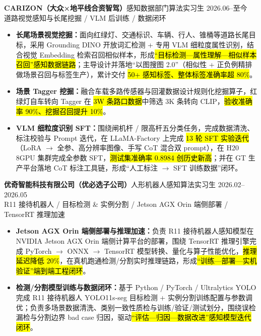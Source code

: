 \section[实习经历]{}
{\small\textbf{CARIZON（大众×地平线合资智驾）}}\quad 感知数据部门算法实习生 \hfill {2026.06--至今}\\
{\scriptsize\color{WHU_Blue} 道路视觉感知与长尾挖掘 / VLM 后训练 / 数据闭环}
\begin{itemize}
    \item \textbf{长尾场景视觉挖掘：}面向红绿灯、交通标识、车辆、行人、锥桶等道路长尾目标，采用 Grounding DINO 开放词汇检测 + 专用 VLM 细粒度属性识别，结合视觉 Embedding 检索召回相似样本，形成\hl{“目标检测—属性理解—相似样本召回”感知数据链路}；主导设计并落地“以图搜图 2.0”（相似性 + 正负例精排做场景召回与标签生产），累计交付 \hl{50+ 感知标签、整体标签准确率超 80\%}。
    \item \textbf{场景 Tagger 挖掘：}融合车载多路传感器与回灌数据设计规则化挖掘算子，红绿灯自车转向 Tagger 在 \hl{3W 条路口数据}中筛选 3K 条转向 CLIP，\hl{验收准确率 90\%、挖掘召回提升 10\%}。
    \item \textbf{VLM 细粒度识别 SFT：}围绕闸机杆 / 限高杆五分类任务，完成数据清洗、标注校验与 Prompt 迭代，在 LLaMA-Factory 上完成 \hl{13 轮 SFT 实验迭代}（LoRA $\rightarrow$ 全参、高分辨率图像、手写 CoT 混合双 prompt），在 H20 8GPU 集群完成全参数 SFT，\hl{测试集准确率 0.8984 创历史新高}；并在 GT 生产平台落地 CoT 标注工具链，形成“人工标注 $\rightarrow$ SFT 训练数据”闭环。
\end{itemize}

\vspace{0.30em}
{\small\textbf{优奇智能科技有限公司（优必选子公司）}}\quad 人形机器人感知算法实习生 \hfill {2026.02--2026.05} \\
{\scriptsize\color{WHU_Blue} R11 接待机器人 / 目标检测 \& 实例分割 / Jetson AGX Orin 端侧部署 / TensorRT 推理加速}
\begin{itemize}
    \item \textbf{Jetson AGX Orin 端侧部署与推理加速：}负责 R11 接待机器人感知模型在 NVIDIA Jetson AGX Orin 端侧计算平台的部署，围绕 TensorRT 推理引擎完成 PyTorch $\rightarrow$ ONNX $\rightarrow$ TensorRT 模型转换、量化与算子性能优化，\hl{推理延迟降低 20\%}，在真机跑通检测/分割实时推理链路，形成\hl{“训练—部署—实机验证”端到端工程闭环}。
    \item \textbf{检测/分割模型训练与数据闭环：}基于 Python / PyTorch / Ultralytics YOLO 完成 R11 接待机器人 YOLO11s-seg 目标检测 + 实例分割训练配置与参数调优；负责多场景数据清洗、类别一致性质检与训练/验证/测试划分，围绕误检漏检与分割边界 bad case 归因，驱动\hl{“评估—归因—数据改进”感知模型迭代闭环}。
\end{itemize}

